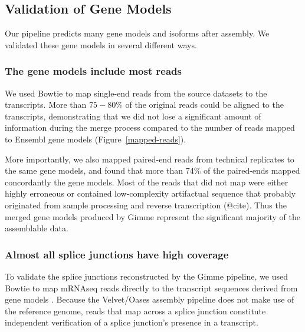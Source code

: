 \documentclass[10pt]{article}
\begin{document}
\subsection*{Validation of Gene Models}

Our pipeline predicts many gene models and isoforms after assembly.  We
validated these gene models in several different ways.


\subsubsection*{The gene models include most reads}

We used Bowtie to map single-end reads from the source datasets to the
transcripts.  More than $75-80$\% of the original reads could be aligned to the
transcripts, demonstrating that we did not lose a significant amount of
information during the merge process compared to the number of reads mapped to
Ensembl gene models (Figure~\ref{mapped-reads}).

More importantly, we also mapped paired-end reads from technical replicates to
the same gene models, and found that more than 74\% of the paired-ends mapped
concordantly the gene models.  Most of the reads that did not map were either
highly erroneous or contained low-complexity artifactual sequence that probably
originated from sample processing and reverse transcription (@cite).  Thus the
merged gene models produced by Gimme represent the significant majority of the
assemblable data.



\subsubsection*{Almost all splice junctions have high coverage}

To validate the splice junctions reconstructed by the Gimme pipeline,
we used Bowtie to map mRNAseq reads directly to the transcript sequences
derived from gene models \cite{Langmead:2009fv}.  Because the
Velvet/Oases assembly pipeline does not make use of the reference
genome, reads that map across a splice junction constitute independent
verification of a splice junction's presence in a transcript.
\end{document}
